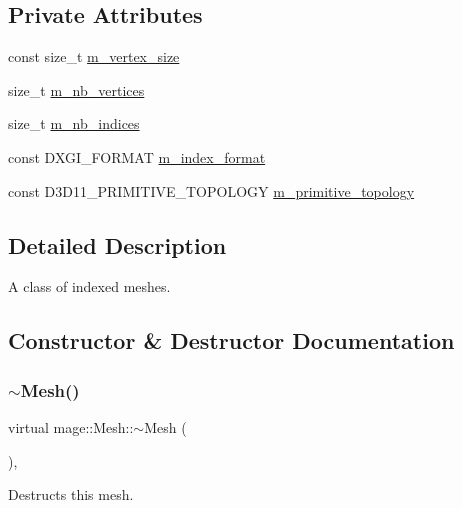\subsection*{Private Attributes}
\begin{DoxyCompactItemize}
\item 
const size\+\_\+t \hyperlink{classmage_1_1_mesh_ab3ebdfffca054f32ac69e47c486d57b1}{m\+\_\+vertex\+\_\+size}
\item 
size\+\_\+t \hyperlink{classmage_1_1_mesh_a5a04aa73e98c75dd5b8929296c3af9bb}{m\+\_\+nb\+\_\+vertices}
\item 
size\+\_\+t \hyperlink{classmage_1_1_mesh_a5e3baa9e2b2e9b4ce795a456f76d87b2}{m\+\_\+nb\+\_\+indices}
\item 
const D\+X\+G\+I\+\_\+\+F\+O\+R\+M\+AT \hyperlink{classmage_1_1_mesh_a93dbb92d756948df3b08fc29426c6acf}{m\+\_\+index\+\_\+format}
\item 
const D3\+D11\+\_\+\+P\+R\+I\+M\+I\+T\+I\+V\+E\+\_\+\+T\+O\+P\+O\+L\+O\+GY \hyperlink{classmage_1_1_mesh_a329fab0ad24e11b73a8981c6d09a0c7c}{m\+\_\+primitive\+\_\+topology}
\end{DoxyCompactItemize}


\subsection{Detailed Description}
A class of indexed meshes. 

\subsection{Constructor \& Destructor Documentation}
\hypertarget{classmage_1_1_mesh_a53b4b9054a518c1f7e2078fdc65a95b8}{}\label{classmage_1_1_mesh_a53b4b9054a518c1f7e2078fdc65a95b8} 
\subsubsection{\texorpdfstring{$\sim$\+Mesh()}{~Mesh()}}
{\footnotesize\ttfamily virtual mage\+::\+Mesh\+::$\sim$\+Mesh (\begin{DoxyParamCaption}{ }\end{DoxyParamCaption})\hspace{0.3cm}{\ttfamily [virtual]}, {\ttfamily [default]}}

Destructs this mesh. \hypertarget{classmage_1_1_mesh_a364e6ecdca96e9b4932aea8711f2bb12}{}\label{classmage_1_1_mesh_a364e6ecdca96e9b4932aea8711f2bb12} 
